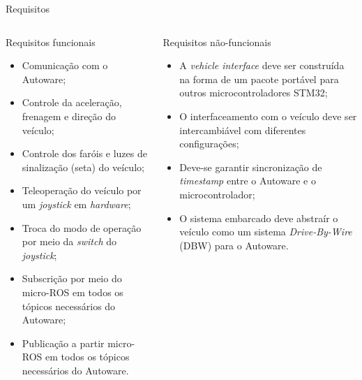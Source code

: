 \documentclass{if-beamer}
\begin{document}
\begin{frame}{Requisitos}
	
	\begin{columns}
		
		\begin{column}{0.5\textwidth}
			
			\begin{block}{Requisitos funcionais}
				
				\begin{itemize}
					\item Comunicação com o Autoware;
					\item Controle da aceleração, frenagem e direção do veículo;
					\item Controle dos faróis e luzes de sinalização (seta) do veículo;
					\item Teleoperação do veículo por um \textit{joystick} em  \textit{hardware};
					\item Troca do modo de operação por meio da \textit{switch} do \textit{joystick};
					\item Subscrição por meio do micro-ROS em todos os tópicos necessários do Autoware;
					\item Publicação a partir micro-ROS em todos os tópicos necessários do Autoware.
					
				\end{itemize}
				
			\end{block}
			
		\end{column}
		
		\hspace{-0.5cm}
		
		\begin{column}{0.5\textwidth}
			
			\begin{block}{Requisitos não-funcionais}
				
				\begin{itemize}
					\item A \textit{vehicle interface} deve ser construída na forma de um pacote portável para outros microcontroladores STM32;
					\item O interfaceamento com o veículo deve ser intercambiável com diferentes configurações;
					\item Deve-se garantir sincronização de \textit{timestamp} entre o Autoware e o microcontrolador;
					\item O sistema embarcado deve abstraír o veículo como um sistema \textit{Drive-By-Wire} (DBW) para o Autoware.
				\end{itemize}
				
			\end{block}
			
		\end{column}
		
	\end{columns}
	
	
\end{frame}
\end{document}
